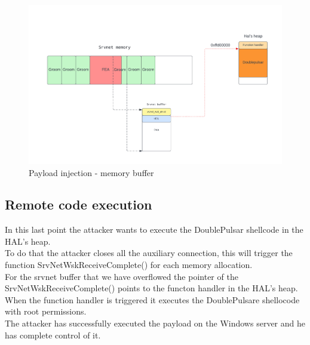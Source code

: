 \begin{figure}[ht!]
    \centering
      \includegraphics[scale=0.5]{images/exploit_6_buff.png}
      \caption{Payload injection - memory buffer}
\end{figure}

\clearpage
\subsection{Remote code execution}
In this last point the attacker wants to execute the DoublePulsar shellcode in the HAL's heap.\\
To do that the attacker closes all the auxiliary connection, this will trigger the function SrvNetWskReceiveComplete() for each memory allocation.\\
For the srvnet buffer that we have overflowed the pointer of the SrvNetWskReceiveComplete() points to the functon handler in the HAL's heap. 
When the function handler is triggered it executes the DoublePulsare shellocode with root permissions.\\
The attacker has successfully executed the payload on the Windows server and he has complete control of it.

